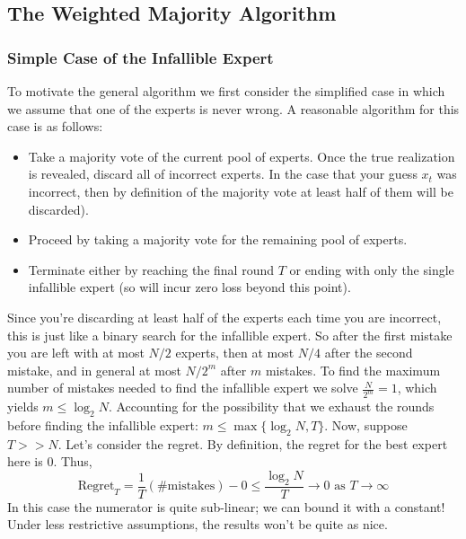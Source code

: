 \documentclass[12pt]{article}
\begin{document}
\subsection{The Weighted Majority Algorithm}

\subsubsection{Simple Case of the Infallible Expert}
To motivate the general algorithm we first consider the simplified case in which we assume that one of the experts is never wrong. A reasonable algorithm for this case is as follows: 
\begin{itemize}
\item Take a majority vote of the current pool of experts. Once the true realization is revealed, discard all of incorrect experts. In the case that your guess $x_t$ was incorrect, then by definition of the majority
vote at least half of them will be discarded). 
\item Proceed by taking a majority vote for the remaining pool of experts. 
\item Terminate either by reaching the final round $T$ or ending with only the single infallible expert (so will incur zero loss beyond this point). 
\end{itemize}
Since you're discarding at least half of the experts each time you are incorrect, this is just like a binary search for the infallible expert. So after the first mistake you are left with at most
$N/2$ experts, then at most $N/4$ after the second mistake, and in general at most $N/2^m$ after $m$ mistakes. To find the maximum number of mistakes needed to find the infallible expert
we solve $\frac{N}{2^m} = 1$, which yields $m \leq \log_2 N$. Accounting for the possibility that we exhaust the rounds before finding the infallible expert: $m \leq \max\{\log_2 N, T\}$. 
Now, suppose $T >> N$. Let's consider the regret. By definition, the regret for the best expert here is $0$. Thus, 
\[\text{Regret}_T = \frac{1}{T}(\text{\# mistakes}) - 0 \leq \frac{\log_2 N}{T} \to 0 \text{ as } T \to \infty \]
In this case the numerator is quite sub-linear; we can bound it with a constant! Under less restrictive assumptions, the results won't be quite as nice. 
\end{document}
